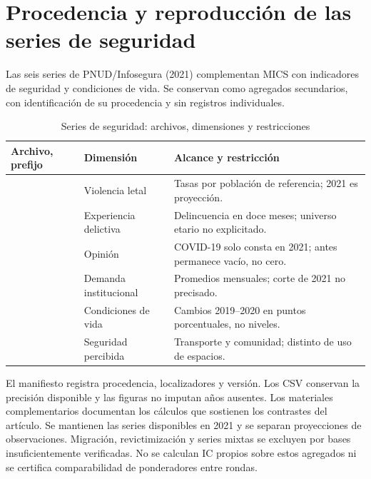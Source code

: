 \section{Procedencia y reproducción de las series de seguridad}\label{anexo:infosegura}
Las seis series de PNUD/Infosegura (2021) complementan MICS con indicadores
de seguridad y condiciones de vida. Se conservan como agregados secundarios,
con identificación de su procedencia y sin registros individuales.

\begin{table}[htbp]
\centering\small
\caption{Series de seguridad: archivos, dimensiones y restricciones}\label{tab:traza_infosegura}
\begin{tabularx}{\textwidth}{@{}p{3.5cm}p{2.5cm}Y@{}}\toprule
Archivo, prefijo  & Dimensión & Alcance y restricción\\\midrule
{} & Violencia letal & Tasas por población de referencia; 2021 es proyección.\\
 & Experiencia delictiva & Delincuencia en doce meses; universo etario no explicitado.\\
 & Opinión & COVID-19 solo consta en 2021; antes permanece vacío, no cero.\\
 & Demanda institucional & Promedios mensuales; corte de 2021 no precisado.\\
 & Condiciones de vida & Cambios 2019--2020 en puntos porcentuales, no niveles.\\
 & Seguridad percibida & Transporte y comunidad; distinto de uso de espacios.\\\bottomrule
\end{tabularx}
\end{table}

El manifiesto  registra procedencia,
localizadores y versión. Los CSV conservan la precisión disponible y las
figuras no imputan años ausentes. Los materiales complementarios documentan
los cálculos que sostienen los contrastes del artículo.
Se mantienen las series disponibles en 2021 y se separan proyecciones de
observaciones. Migración, revictimización y series mixtas se excluyen por
bases insuficientemente verificadas. No se calculan IC propios sobre estos
agregados ni se certifica comparabilidad de ponderadores entre rondas.
